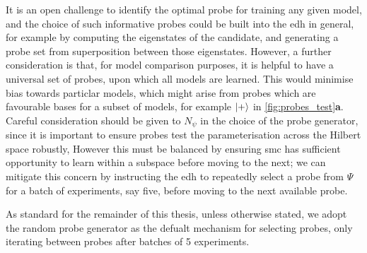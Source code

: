 It is an open challenge to identify the optimal probe for training any given model, 
    and the choice of such informative probes could be built into the \gls{edh} in general, 
    for example by computing the eigenstates of the candidate, and generating a probe set
    from superposition between those eigenstates. 
However, a further consideration is that, for model comparison purposes, 
    it is helpful to have a universal set of probes, upon which all models are learned. 
This would minimise bias towards particlar models, which might arise from probes which are favourable bases 
    for a subset of models, for example $\ket{+}$ in \cref{fig:probes_test}\textbf{a}. 
Careful consideration should be given to $N_{\psi}$ in the choice of the probe generator, 
    since it is important to ensure probes test the parameterisation across the Hilbert space robustly, 
However this must be balanced by ensuring \gls{smc} has sufficient opportunity to learn within a subspace before moving to the next; 
    we can mitigate this concern by instructing the \gls{edh} to repeatedly select a probe from $\Psi$ for a batch of experiments, 
    say five, before moving to the next available probe. 
\par 

As standard for the remainder of this thesis, unless otherwise stated, 
    we adopt the random probe generator as the defualt mechanism for selecting probes,
    only iterating between probes after batches of 5 experiments.
